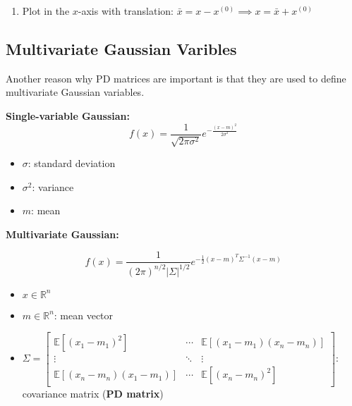 \begin{process}
\begin{enumerate}
        
        \item Plot in the $x$-axis with translation: $\bar{x} = x - x^{(0)} \implies x = \bar{x} + x^{(0)}$
        
    \end{enumerate}
\end{process}

\subsection{Multivariate Gaussian Varibles}
\begin{example}
    Another reason why PD matrices are important is that they are used to define multivariate Gaussian variables.
    \vspace{1em}

    \textbf{Single-variable Gaussian:}
    \[
    f(x) = \frac{1}{\sqrt{2\pi\sigma^2}} e^{-\frac{(x-m)^2}{2\sigma^2}}
    \]

    \begin{itemize}
        \item $\sigma$: standard deviation
        \item $\sigma^2$: variance
        \item $m$: mean
    \end{itemize}

    \vspace{1em}

    \textbf{Multivariate Gaussian:}

    \[
    f(x) = \frac{1}{(2\pi)^{n/2} |\Sigma|^{1/2}} e^{-\frac{1}{2}(x-m)^T \Sigma^{-1}(x-m)}
    \]

    \begin{itemize}
        \item $x \in \mathbb{R}^n$
        \item $m \in \mathbb{R}^n$: mean vector 

        \item $\Sigma =
        \begin{bmatrix}
        \mathbb{E}[(x_1 - m_1)^2] &  \cdots & \mathbb{E}[(x_1 - m_1)(x_n - m_n)] \\
        \vdots & \ddots & \vdots \\
        \mathbb{E}[(x_n - m_n)(x_1 - m_1)] & \cdots & \mathbb{E}[(x_n - m_n)^2]
        \end{bmatrix}$: covariance matrix (\textbf{PD matrix})
    \end{itemize}


\end{example}

